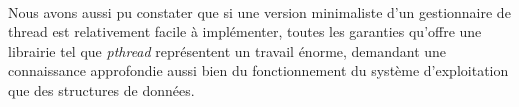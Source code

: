 \documentclass{article}
\begin{document}
    \paragraph{}
    Nous avons aussi pu constater que si une version minimaliste d'un
    gestionnaire de thread est relativement facile à implémenter, toutes les
    garanties qu'offre une librairie tel que {\em pthread} représentent un
    travail énorme, demandant une connaissance approfondie aussi bien du
    fonctionnement du système d'exploitation que des structures de données.
\end{document}
